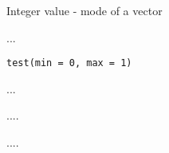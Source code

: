 \documentclass[a4paper]{book}
\begin{document}
%
\begin{Value}
Integer value - mode of a vector
\end{Value}
%
\begin{Description}\relax
...
\end{Description}
%
\begin{Usage}
\begin{verbatim}
test(min = 0, max = 1)
\end{verbatim}
\end{Usage}
%
\begin{Arguments}
\begin{ldescription}
\item[\code{min}] ...

\item[\code{max}] ....
\end{ldescription}
\end{Arguments}
%
\begin{Value}
....
\end{Value}
\printindex{}
\end{document}
